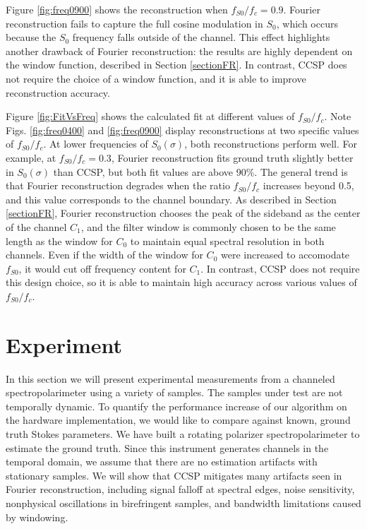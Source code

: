 \documentclass[10pt]{article}
\numberwithin{equation}{subsection}
\begin{document}
    Figure \ref{fig:freq0900} shows the reconstruction when $f_{S0} / f_c = 0.9$.
    Fourier reconstruction fails to capture the full cosine modulation in $S_0$, which occurs because the $S_0$ frequency falls outside of the channel.
    This effect highlights another drawback of Fourier reconstruction: the results are highly dependent on the window function, described in Section \ref{sectionFR}.
    In contrast, CCSP does not require the choice of a window function, and it is able to improve reconstruction accuracy.

    Figure \ref{fig:FitVsFreq} shows the calculated fit at different values of $f_{S0} / f_c$.
    Note Figs. \ref{fig:freq0400} and \ref{fig:freq0900} display reconstructions at two specific values of $f_{S0} / f_c$.
    At lower frequencies of $S_0(\sigma)$, both reconstructions perform well.
    For example, at $f_{S0} / f_c = 0.3$, Fourier reconstruction fits ground truth slightly better in $S_0(\sigma)$ than CCSP, but both fit values are above 90\%.
    The general trend is that Fourier reconstruction degrades when the ratio $f_{S0} / f_c$ increases beyond 0.5, and this value corresponds to the channel boundary.
    As described in Section \ref{sectionFR}, Fourier reconstruction chooses the peak of the sideband as the center of the channel $C_1$, and the filter window is commonly chosen to be the same length as the window for $C_0$ to maintain equal spectral resolution in both channels.
    Even if the width of the window for $C_0$ were increased to accomodate $f_{S0}$, it would cut off frequency content for $C_1$.
    In contrast, CCSP does not require this design choice, so it is able to maintain high accuracy across various values of $f_{S0} / f_c$.

\section{Experiment}\label{SectionExperiment}

In this section we will present experimental measurements from a channeled spectropolarimeter using a variety of samples.
The samples under test are not temporally dynamic.
To quantify the performance increase of our algorithm on the hardware implementation, we would like to compare against known, ground truth Stokes parameters.
We have built a rotating polarizer spectropolarimeter to estimate the ground truth.
Since this instrument generates channels in the temporal domain, we assume that there are no estimation artifacts with stationary samples.
We will show that CCSP mitigates many artifacts seen in Fourier reconstruction, including signal falloff at spectral edges, noise sensitivity, nonphysical oscillations in birefringent samples, and bandwidth limitations caused by windowing.
\end{document}
